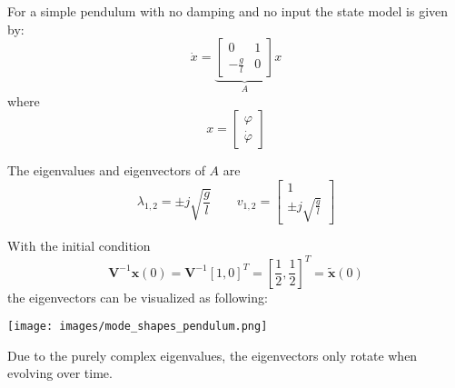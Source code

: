 \begin{examplesection}
    For a simple pendulum with no damping and no input the state model is given by:
    \begin{equation*}
        \dot{x}=\underbrace{\begin{bmatrix}
                0            & 1 \\
                -\frac{g}{l} & 0
            \end{bmatrix}}_{A}x
    \end{equation*}
    where
    \begin{equation*}
        x=\begin{bmatrix}
            \varphi \\
            \dot{\varphi}
        \end{bmatrix}
    \end{equation*}

    The eigenvalues and eigenvectors of $A$ are
    \begin{equation*}
        \lambda_{1,2} = \pm j \sqrt{\frac{g}{l}} \qquad v_{1,2}=\begin{bmatrix}
            1 \\
            \pm j \sqrt{\frac{g}{l}}
        \end{bmatrix}
    \end{equation*}

    With the initial condition
    \noindent\begin{equation*}
        \mathbf{V}^{-1}\mathbf{x}(0) = \mathbf{V}^{-1}{[1, 0]}^T = {\left[\frac{1}{2}, \frac{1}{2}\right]}^T = \tilde{\mathbf{x}}(0)
    \end{equation*}
    the eigenvectors can be visualized as following:

    \texttt{[image: images/mode\_shapes\_pendulum.png]}

    Due to the purely complex eigenvalues, the eigenvectors only rotate when evolving over time.


\end{examplesection}
